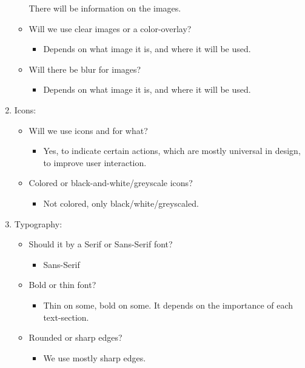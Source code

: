 \documentclass{article}
\begin{document}
\begin{enumerate}
\begin{itemize}
        There will be information on the images. 
        \item Will we use clear images or a color-overlay?
        \begin{itemize}
            \item Depends on what image it is, and where it will be used.
        \end{itemize}
        \item Will there be blur for images?
        \begin{itemize}
            \item Depends on what image it is, and where it will be used.
        \end{itemize}
    \end{itemize}
    \item Icons:
    \begin{itemize}
        \item Will we use icons and for what?
        \begin{itemize}
            \item Yes, to indicate certain actions, which are mostly universal in design, to improve user interaction.
        \end{itemize}
        \item Colored or black-and-white/greyscale icons?
        \begin{itemize}
            \item Not colored, only black/white/greyscaled.
        \end{itemize}
    \end{itemize}
    \item Typography:
    \begin{itemize}
        \item Should it by a Serif or Sans-Serif font?
        \begin{itemize}
            \item Sans-Serif
        \end{itemize}
        \item Bold or thin font?
        \begin{itemize}
            \item Thin on some, bold on some. It depends on the importance of each text-section.
        \end{itemize}
        \item Rounded or sharp edges?
        \begin{itemize}
            \item We use mostly sharp edges.

\end{itemize}
\end{itemize}
\end{enumerate}
\end{document}
